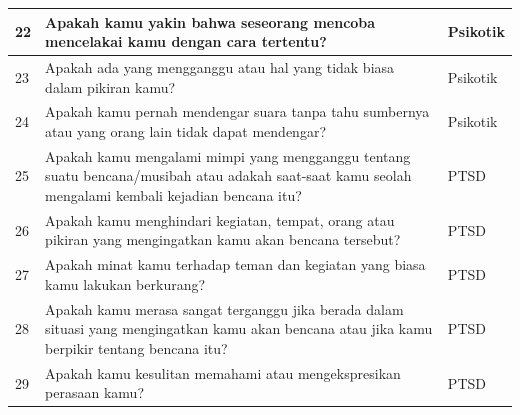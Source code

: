 {\begin{longtable}{|p{0.7cm}|p{8.9cm}|p{3.0cm}|}
\hline
22 & Apakah kamu yakin bahwa seseorang mencoba mencelakai kamu dengan cara tertentu? & Psikotik \\
\hline
23 & Apakah ada yang mengganggu atau hal yang tidak biasa dalam pikiran kamu? & Psikotik \\
\hline
24 & Apakah kamu pernah mendengar suara tanpa tahu sumbernya atau yang orang lain tidak dapat mendengar? & Psikotik \\
\hline
25 & Apakah kamu mengalami mimpi yang mengganggu tentang suatu bencana/musibah atau adakah saat-saat kamu seolah mengalami kembali kejadian bencana itu? & PTSD \\
\hline
26 & Apakah kamu menghindari kegiatan, tempat, orang atau pikiran yang mengingatkan kamu akan bencana tersebut? & PTSD \\
\hline
27 & Apakah minat kamu terhadap teman dan kegiatan yang biasa kamu lakukan berkurang? & PTSD \\
\hline
28 & Apakah kamu merasa sangat terganggu jika berada dalam situasi yang mengingatkan kamu akan bencana atau jika kamu berpikir tentang bencana itu? & PTSD \\
\hline
29 & Apakah kamu kesulitan memahami atau mengekspresikan perasaan kamu? & PTSD \\
\hline
\end{longtable}
}
\clearpage
